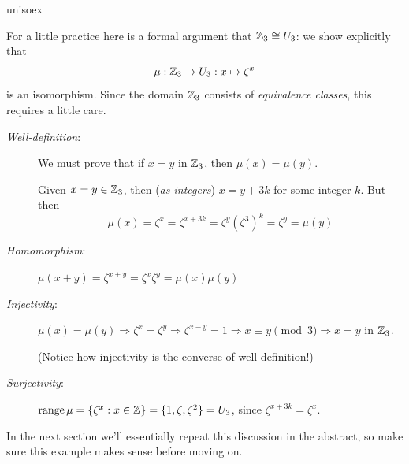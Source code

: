 \begin{examples}{}{unisoex}
\begin{enumerate}
		\goodbreak
		
		For a little practice here is a formal argument that $\mathbb{Z}_3\cong U_3$: we show explicitly that 
		\[
			\mu:\mathbb{Z}_3\to U_3:x\mapsto\zeta^x
		\]
		is an isomorphism. Since the domain $\mathbb{Z}_3$ consists of \emph{equivalence classes}, this requires a little care.
	\begin{description}
  	\item[\emph{Well-definition}:] We must prove that if $x=y$ in $\mathbb{Z}_3$, then $\mu(x)=\mu(y)$.\par
  	Given $x=y\in\mathbb{Z}_3$, then (\emph{as integers}) $x=y+3k$ for some integer $k$. But then
  	\[
  		\mu(x) =\zeta^x =\zeta^{x+3k} =\zeta^y(\zeta^{3})^k =\zeta^y =\mu(y)
  	\]
  	\item[\emph{Homomorphism}:] $\mu(x+y) =\zeta^{x+y} =\zeta^x\zeta^y =\mu(x)\mu(y)$
  	\item[\emph{Injectivity}:] $\mu(x)=\mu(y)\Longrightarrow \zeta^x=\zeta^y\Longrightarrow \zeta^{x-y}=1\Longrightarrow x\equiv y\pmod 3\Longrightarrow x=y$ in $\mathbb{Z}_3$.\par
  	(Notice how injectivity is the converse of well-definition!)
  	\item[\emph{Surjectivity}:] $\operatorname{range}\mu =\{\zeta^x:x\in\mathbb{Z}\} =\{1,\zeta,\zeta^2\} =U_3$, since $\zeta^{x+3k}=\zeta^x$.
	\end{description}
In the next section we'll essentially repeat this discussion in the abstract, so make sure this example makes sense before moving on.
	\end{enumerate}
\end{examples}



% 
% 



